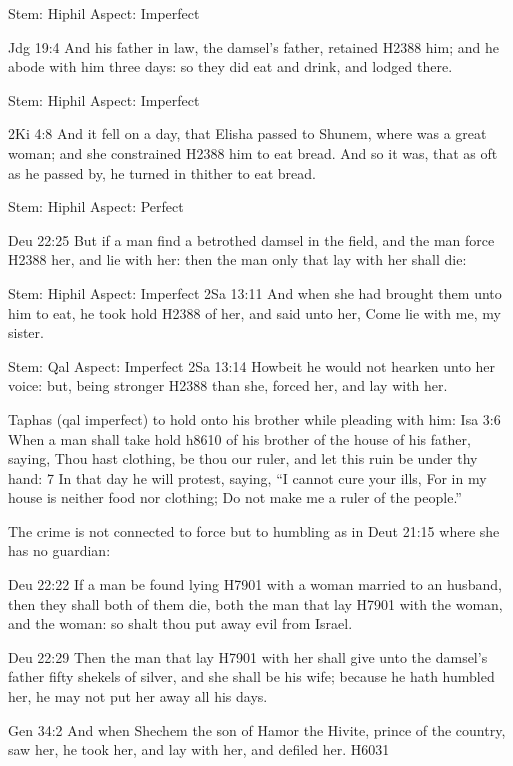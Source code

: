 \documentclass[11pt]{article}
\begin{document}
Stem: Hiphil
Aspect: Imperfect

Jdg 19:4
And his father in law, the damsel's father, retained H2388 him; and he abode with him three days: so they did eat and drink, and lodged there.



Stem: Hiphil
Aspect: Imperfect

2Ki 4:8
And it fell on a day, that Elisha passed to Shunem, where was a great woman; and she constrained H2388 him to eat bread. And so it was, that as oft as he passed by, he turned in thither to eat bread.



Stem: Hiphil
Aspect: Perfect

Deu 22:25
But if a man find a betrothed damsel in the field, and the man force H2388 her, and lie with her: then the man only that lay with her shall die:


Stem: Hiphil
Aspect: Imperfect
2Sa 13:11
And when she had brought them unto him to eat, he took hold H2388 of her, and said unto her, Come lie with me, my sister.

Stem: Qal
Aspect: Imperfect
2Sa 13:14
Howbeit he would not hearken unto her voice: but, being stronger H2388 than she, forced her, and lay with her.




Taphas (qal imperfect) to hold onto his brother while pleading with him:
Isa 3:6
When a man shall take hold h8610 of his brother of the house of his father, saying, Thou hast clothing, be thou our ruler, and let this ruin be under thy hand:
7 In that day he will protest, saying,
“I cannot cure your ills,
For in my house is neither food nor clothing;
Do not make me a ruler of the people.”


The crime is not connected to force but to humbling as in Deut 21:15 where she has no guardian:

Deu 22:22
If a man be found lying H7901 with a woman married to an husband, then they shall both of them die, both the man that lay H7901 with the woman, and the woman: so shalt thou put away evil from Israel.

Deu 22:29
Then the man that lay H7901 with her shall give unto the damsel's father fifty shekels of silver, and she shall be his wife; because he hath humbled her, he may not put her away all his days.



Gen 34:2
And when Shechem the son of Hamor the Hivite, prince of the country, saw her, he took her, and lay with her, and defiled her. H6031
\end{document}
